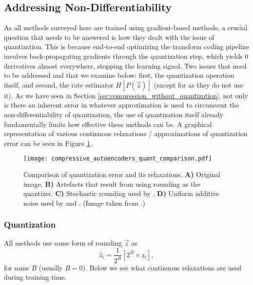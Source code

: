 \subsection{Addressing Non-Differentiability}
\label{sec:comp_quant}
\par
As all methods surveyed here are trained using gradient-based methods, a crucial
question that needs to be answered is how they dealt with the issue of
quantization. This is because end-to-end optimizing the transform coding
pipeline involves back-propagating gradients through the quantization step, which
yields 0 derivatives almost everywhere, stopping the learning signal.
Two issues that need to be addressed and that we examine
below: first, the quantization operation itself, and second,
the rate estimator $H[P(\vec{z})]$ (except for \cite{rippel2017real} as they do
not use it). As we have
seen in Section \ref{sec:compression_without_quantization}, not only is there
an inherent error in whatever approximation is used to circumvent the
non-differentiability of quantization, the use of quantization itself already
fundamentally limits how
effective these methods can be. A graphical representation of various continuous
relaxations / approximations of quantization error can be seen in Figure
\ref{fig:quantization_models}. 
\begin{figure}
  \centering 
  \texttt{[image: compressive\_autoencoders\_quant\_comparison.pdf]}
  \caption[Comparison of quantization error and its relaxations.]
  {Comparison of quantization error and its relaxations. \textbf{A)}
    Original image. \textbf{B)} Artefacts that result from using rounding as the
    quantizer. \textbf{C)} Stochastic rounding used by \cite{toderici2017full}.
    \textbf{D)} Uniform additive noise used by \cite{balle2016end} and
    \cite{balle2018variational}. (Image taken from \cite{theis2017lossy}.)}
  \label{fig:quantization_models}
 \end{figure}

\subsubsection{Quantization}
\par
All methods use some form of rounding $\vec{z}$ as
\begin{equation}
\label{eq:quantization_step}
  \hat{z}_i = \frac{1}{2^B}\left[2^B \times z_i\right], 
\end{equation}
for some $B$ (usually $B = 0$). Below we see what continuous relaxations are used
during training time.
 

